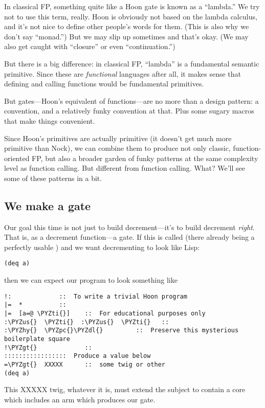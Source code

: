 In classical FP, something quite like a Hoon gate is known as a
``lambda.'' We try not to use this term, really.  Hoon is obviously
not based on the lambda calculus, and it's not nice to define
other people's words for them.  (This is also why we don't say
``monad.'')  But we may slip up sometimes and that's okay.  (We may
also get caught with ``closure'' or even ``continuation.'') 

But there is a big difference: in classical FP, ``lambda'' is a
fundamental semantic primitive.  Since these are \emph{functional}
languages after all, it makes sense that defining and calling
functions would be fundamental primitives.  

But gates---Hoon's equivalent of functions---are no more than a
design pattern: a convention, and a relatively funky convention
at that.  Plus some sugary macros that make things convenient.

Since Hoon's primitives are actually primitive (it doesn't get
much more primitive than Nock), we can combine them to produce
not only classic, function-oriented FP, but also a broader garden
of funky patterns at the same complexity level as function
calling.  But different from function calling.  What?  We'll see
some of these patterns in a bit.

\subsection{We make a gate}

Our goal this time is not just to build decrement---it's to build
decrement \emph{right}.  That is, as a decrement function---a gate.
If this is called  (there already being a perfectly usable 
) and we want decrementing  to look like Lisp:

\begin{framed_shaded}
\begin{Verbatim}[fontsize=\relsize{-2.5},fontseries=b,commandchars=\\\{\}]
(deq a)
\end{Verbatim}
\end{framed_shaded}
then we can expect our program to look something like 

\begin{framed_shaded}
\begin{Verbatim}[fontsize=\relsize{-2.5},fontseries=b,commandchars=\\\{\}]
!:             ::  To write a trivial Hoon program
|=  *          ::
|=  [a=@ \PYZti{}]    ::  For educational purposes only
:\PYZus{}  \PYZti{}  :\PYZus{}  \PYZti{}   ::
:\PYZhy{}  \PYZpc{}\PYZdl{}         ::  Preserve this mysterious boilerplate square
!\PYZgt{}             ::
:::::::::::::::::  Produce a value below
=\PYZgt{}  XXXXX      ::  some twig or other
(deq a)
\end{Verbatim}
\end{framed_shaded}
This XXXXX twig, whatever it is, must extend the subject to
contain a core which includes an arm which produces our gate.

